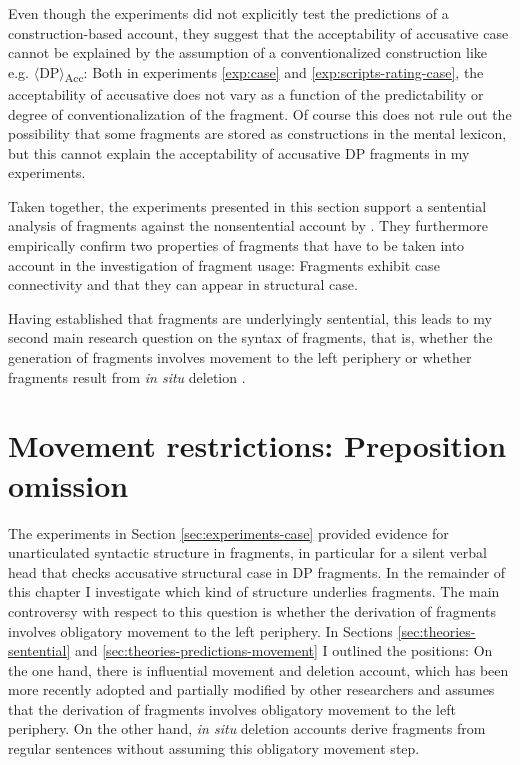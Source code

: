 Even though the experiments did not explicitly test the predictions of a con\-struc\-tion-based account, they suggest that the acceptability of accusative case cannot be explained by the assumption of a conventionalized construction like e.g. $\langle$DP$\rangle$\textsubscript{Acc}: Both in experiments \ref{exp:case} and \ref{exp:scripts-rating-case}, the acceptability of accusative does not vary as a function of the predictability or degree of conventionalization of the fragment. Of course this does not rule out the possibility that some fragments are stored as constructions in the mental lexicon, but this cannot explain the acceptability of accusative DP fragments in my experiments.

\noindent Taken together, the experiments presented in this section support a sentential analysis of fragments against the nonsentential account by \citet{barton.progovac2005}. They furthermore empirically confirm two properties of fragments that have to be taken into account in the investigation of fragment usage: Fragments exhibit case connectivity and that they can appear in structural case.

Having established that fragments are underlyingly sentential, this leads to my second main research question on the syntax of fragments, that is, whether the generation of fragments involves movement to the left periphery \citep{merchant2004} or whether fragments result from \textit{in situ} deletion \citep{reich2007}.

\newpage
\section{Movement restrictions: Preposition omission}
\label{sec:pstranding}

The experiments in Section \ref{sec:experiments-case} provided evidence for unarticulated syntactic structure in fragments, in particular for a silent verbal head that checks accusative structural case in DP fragments. In the remainder of this chapter I investigate which kind of structure underlies fragments. The main controversy with respect to this question is whether the derivation of fragments involves obligatory movement to the left periphery. In Sections \ref{sec:theories-sentential} and \ref{sec:theories-predictions-movement} I outlined the positions: On the one hand, there is  influential movement and deletion account, which has been more recently adopted and partially modified by other researchers \citep[see e.g.][]{aelbrecht2009, sato2011,weir2014, doring2016, saab.liptak2016,  murphy2018} and assumes that the derivation of fragments involves obligatory movement to the left periphery. On the other hand, \textit{in situ} deletion accounts \citep{reich2007, ott.struckmeier2016, griffiths.etal2018} derive fragments from regular sentences without assuming this obligatory movement step.

